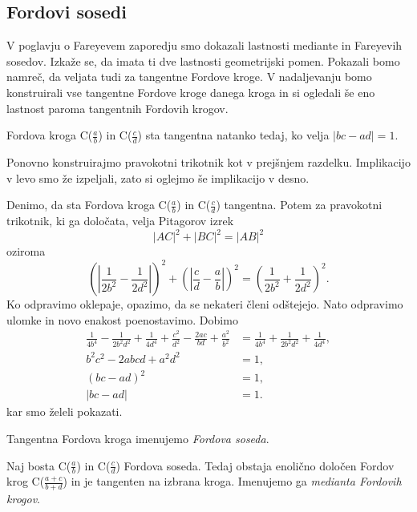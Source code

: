 \documentclass[mat1]{fmfdelo}
\begin{document}
\subsection{Fordovi sosedi}

V poglavju o Fareyevem zaporedju smo dokazali lastnosti mediante in Fareyevih sosedov. Izkaže se, da imata ti dve lastnosti geometrijski pomen. Pokazali bomo namreč, da veljata tudi za tangentne Fordove kroge. V nadaljevanju bomo konstruirali vse tangentne Fordove kroge danega kroga in si ogledali še eno lastnost paroma tangentnih Fordovih krogov.

\begin{trditev}
\label{trd:FordTangentnost}
Fordova kroga C($\frac{a}{b}$) in C($\frac{c}{d}$) sta tangentna natanko tedaj, ko velja \( |bc-ad|=1. \)
\end{trditev}

\begin{dokaz}
%
Ponovno konstruirajmo pravokotni trikotnik kot v prejšnjem razdelku. Implikacijo v levo smo že izpeljali, zato si oglejmo še implikacijo v desno.

Denimo, da sta Fordova kroga C($\frac{a}{b}$) in C($\frac{c}{d}$) tangentna. Potem za pravokotni trikotnik, ki ga določata, velja Pitagorov izrek 
\[ |AC|^2 + |BC|^2 = |AB|^2 \] oziroma
\[ \left ( \left | \frac{1}{2b^2} - \frac{1}{2d^2} \right | \right )^2 + \left ( \left| \frac{c}{d} - \frac{a}{b} \right| \right )^2 = \left (\frac{1}{2b^2} + \frac{1}{2d^2} \right )^2. \]
Ko odpravimo oklepaje, opazimo, da se nekateri členi odštejejo. Nato odpravimo ulomke in novo enakost poenostavimo. Dobimo
\begin{align*}
\frac{1}{4b^4} - \frac{1}{2b^{2}d^{2}} + \frac{1}{4d^4} + \frac{c^2}{d^2} - \frac{2ac}{bd} + \frac{a^2}{b^2} &= \frac{1}{4b^4} + \frac{1}{2b^{2}d^{2}} + \frac{1}{4d^4}, \\
b^{2}c^{2} - 2abcd + a^{2}d^{2} &= 1, \\
(bc-ad)^2 &= 1, \\
|bc-ad|&=1.
\end{align*}
kar smo želeli pokazati.
\end{dokaz}

\begin{definicija}
Tangentna Fordova kroga imenujemo \emph{Fordova soseda}.
\end{definicija}

\begin{trditev}
Naj bosta C($\frac{a}{b}$) in C($\frac{c}{d}$) Fordova soseda. Tedaj obstaja enolično določen Fordov krog C($\frac{a+c}{b+d}$) in je tangenten na izbrana kroga. Imenujemo ga \emph{medianta Fordovih krogov}.
\end{trditev}
\end{document}
